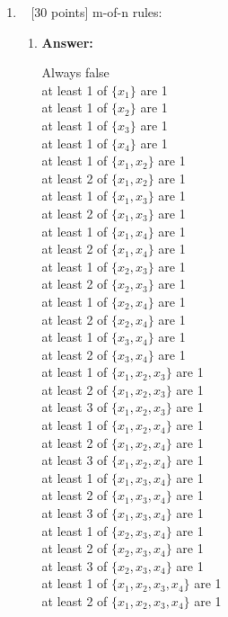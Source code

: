 \documentclass[12pt, fullpage,letterpaper]{article}
\begin{document}
\begin{enumerate}
\item~ [30 points] m-of-n rules:
\begin{enumerate}
\item \textbf{Answer:}
\begin{multicols}{2}
Always false\\
at least 1 of $\{x_1\}$ are 1\\
at least 1 of $\{x_2\}$ are 1\\
at least 1 of $\{x_3\}$ are 1\\
at least 1 of $\{x_4\}$ are 1\\
at least 1 of $\{x_1, x_2\}$ are 1\\
at least 2 of $\{x_1, x_2\}$ are 1\\
at least 1 of $\{x_1, x_3\}$ are 1\\
at least 2 of $\{x_1, x_3\}$ are 1\\
at least 1 of $\{x_1, x_4\}$ are 1\\
at least 2 of $\{x_1, x_4\}$ are 1\\
at least 1 of $\{x_2, x_3\}$ are 1\\
at least 2 of $\{x_2, x_3\}$ are 1\\
at least 1 of $\{x_2, x_4\}$ are 1\\
at least 2 of $\{x_2, x_4\}$ are 1\\
at least 1 of $\{x_3, x_4\}$ are 1\\
at least 2 of $\{x_3, x_4\}$ are 1\\
at least 1 of $\{x_1, x_2, x_3\}$ are 1\\
at least 2 of $\{x_1, x_2, x_3\}$ are 1\\
at least 3 of $\{x_1, x_2, x_3\}$ are 1\\
at least 1 of $\{x_1, x_2, x_4\}$ are 1\\
at least 2 of $\{x_1, x_2, x_4\}$ are 1\\
at least 3 of $\{x_1, x_2, x_4\}$ are 1\\
at least 1 of $\{x_1, x_3, x_4\}$ are 1\\
at least 2 of $\{x_1, x_3, x_4\}$ are 1\\
at least 3 of $\{x_1, x_3, x_4\}$ are 1\\
at least 1 of $\{x_2, x_3, x_4\}$ are 1\\
at least 2 of $\{x_2, x_3, x_4\}$ are 1\\
at least 3 of $\{x_2, x_3, x_4\}$ are 1\\
at least 1 of $\{x_1, x_2, x_3, x_4\}$ are 1\\
at least 2 of $\{x_1, x_2, x_3, x_4\}$ are 1\\

\end{multicols}
\end{enumerate}
\end{enumerate}
\end{document}
